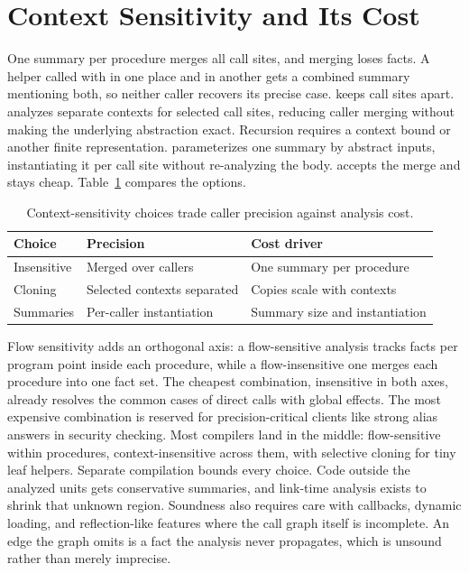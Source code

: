 \section{Context Sensitivity and Its Cost}
\label{sec:ch22-context}

One summary per procedure merges all call sites, and merging loses facts.
A helper called with  in one place and  in another gets a combined summary mentioning both, so neither caller recovers its precise case.
 keeps call sites apart.
 analyzes separate contexts for selected call sites, reducing caller merging without making the underlying abstraction exact.
Recursion requires a context bound or another finite representation.
 parameterizes one summary by abstract inputs, instantiating it per call site without re-analyzing the body.
 accepts the merge and stays cheap.
Table~\ref{tab:ch22-sensitivity} compares the options.

\begin{table}
  \centering
  \caption{Context-sensitivity choices trade caller precision against analysis cost.}
  \label{tab:ch22-sensitivity}
  \begin{tabular}{lll}
    \toprule
    Choice & Precision & Cost driver \\
    \midrule
    Insensitive & Merged over callers & One summary per procedure \\
    Cloning & Selected contexts separated & Copies scale with contexts \\
    Summaries & Per-caller instantiation & Summary size and instantiation \\
    \bottomrule
  \end{tabular}
\end{table}

Flow sensitivity adds an orthogonal axis: a flow-sensitive analysis tracks facts per program point inside each procedure, while a flow-insensitive one merges each procedure into one fact set.
The cheapest combination, insensitive in both axes, already resolves the common cases of direct calls with global effects.
The most expensive combination is reserved for precision-critical clients like strong alias answers in security checking.
Most compilers land in the middle: flow-sensitive within procedures, context-insensitive across them, with selective cloning for tiny leaf helpers.
Separate compilation bounds every choice.
Code outside the analyzed units gets conservative summaries, and link-time analysis exists to shrink that unknown region.
Soundness also requires care with callbacks, dynamic loading, and reflection-like features where the call graph itself is incomplete.
An edge the graph omits is a fact the analysis never propagates, which is unsound rather than merely imprecise.

